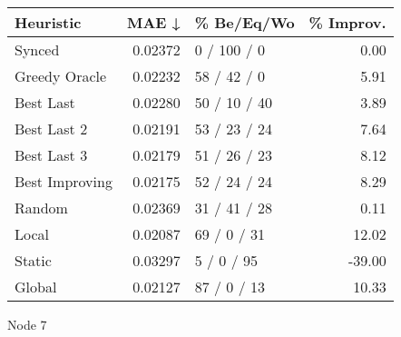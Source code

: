 \begin{tabular}{lrlr}
\toprule
\textbf{Heuristic} & \textbf{MAE ↓} & \textbf{\% Be/Eq/Wo} & \textbf{\% Improv.} \\
\midrule
            Synced &        0.02372 &          0 / 100 / 0 &                0.00 \\
     Greedy Oracle &        0.02232 &          58 / 42 / 0 &                5.91 \\
         Best Last &        0.02280 &         50 / 10 / 40 &                3.89 \\
       Best Last 2 &        0.02191 &         53 / 23 / 24 &                7.64 \\
       Best Last 3 &        0.02179 &         51 / 26 / 23 &                8.12 \\
    Best Improving &        0.02175 &         52 / 24 / 24 &                8.29 \\
            Random &        0.02369 &         31 / 41 / 28 &                0.11 \\
             Local &        0.02087 &          69 / 0 / 31 &               12.02 \\
            Static &        0.03297 &           5 / 0 / 95 &              -39.00 \\
            Global &        0.02127 &          87 / 0 / 13 &               10.33 \\
\bottomrule
\end{tabular}
\caption{Node 7}
\label{tab:non_lr01_le2_bs4_7}
